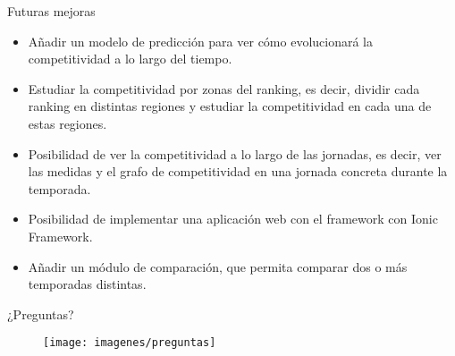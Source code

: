 \documentclass[10pt]{beamer}
\begin{document}
	\begin{frame}{Futuras mejoras}
		\begin{itemize}
			\item Añadir un modelo de predicción para ver cómo evolucionará la competitividad a lo largo del tiempo.
			
			\item Estudiar la competitividad por zonas del ranking, es decir, dividir cada ranking en distintas regiones y estudiar la competitividad en cada una de estas regiones. 
			
			\item Posibilidad de ver la competitividad a lo largo de las jornadas, es decir, ver las medidas y el grafo de competitividad en una jornada concreta durante la temporada.
			
			\item Posibilidad de implementar una aplicación web con el framework con Ionic Framework.
			
			\item Añadir un módulo de comparación, que permita comparar dos o más temporadas distintas.
			
		\end{itemize}
	\end{frame}
	
	
	\begin{frame}{¿Preguntas?}
		\begin{figure}
			\centering
			\texttt{[image: imagenes/preguntas]}
		\end{figure}

	\end{frame}
	
	
\end{document}
